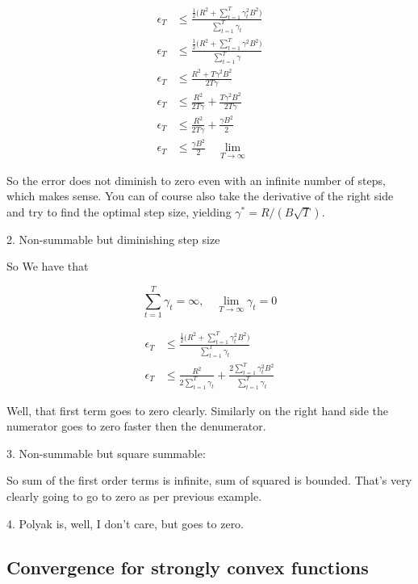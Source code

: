\documentclass{article}
\begin{document}
		\begin{align*}
			\epsilon_T   &\le \frac{ \frac{1}{2}\big(R^2  +  \sum^T_{t=1}  \gamma_t^2 B^2   \big)}{ \sum^T_{t=1} \gamma_t}\\
			\epsilon_T   &\le \frac{ \frac{1}{2}\big(R^2  +  \sum^T_{t=1}  \gamma^2 B^2   \big)}{ \sum^T_{t=1} \gamma}\\
			\epsilon_T   &\le \frac{ R^2  +   T  \gamma^2 B^2   }{ 2T \gamma}\\
			\epsilon_T   &\le \frac{ R^2 }{ 2T \gamma} +  \frac{ T  \gamma^2 B^2   }{ 2T \gamma}\\
			\epsilon_T   &\le \frac{ R^2 }{ 2T \gamma} +  \frac{   \gamma B^2   }{ 2 }\\
			\epsilon_T   &\le  \frac{   \gamma B^2   }{ 2 } \quad\lim_{T\to\infty}
		\end{align*}
		
		So the error does not diminish to zero even with an infinite number of steps, which makes sense. You can of course also take the derivative of the right side and try to find the optimal step size, yielding $\gamma^* = R/(B\sqrt{T})$.
		
		
		2. Non-summable  but diminishing step size
		
		So We have that 
		
		\[ \sum^T_{t=1} \gamma_t = \infty,\quad \lim_{T\to\infty} \gamma_t = 0 \]
			
		\begin{align*}
			\epsilon_T   &\le \frac{ \frac{1}{2}\big(R^2  +  \sum^T_{t=1}  \gamma_t^2 B^2   \big)}{ \sum^T_{t=1} \gamma_t}\\
			\epsilon_T   &\le \frac{ R^2}{2 \sum^T_{t=1} \gamma_t}  +  \frac{ 2\sum^T_{t=1}  \gamma_t^2 B^2   }{ \sum^T_{t=1} \gamma_t}
		\end{align*}	
		
		Well, that first term goes to zero clearly. Similarly on the right hand side the numerator goes to zero faster then the denumerator.
		
		3. Non-summable but square summable:
		
		So sum of the first order terms is infinite, sum of squared is bounded. That's very clearly going to go to zero as per previous example.
		
		4. Polyak is, well, I don't care, but goes to zero.
		
	\subsection{Convergence for strongly convex functions}
	
\end{document}
